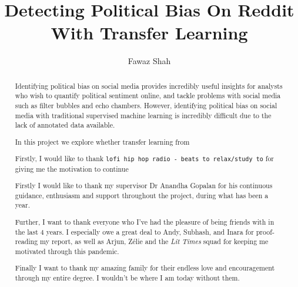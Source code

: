 \documentclass[a4paper, twoside]{report}
\title{Detecting Political Bias On Reddit With Transfer Learning}
\author{Fawaz Shah}
\begin{document}


\begin{abstract}

Identifying political bias on social media provides incredibly useful insights for analysts who wish to quantify political sentiment online, and tackle problems with social media such as filter bubbles and echo chambers. However, identifying political bias on social media with traditional supervised machine learning is incredibly difficult due to the lack of annotated data available.

In this project we explore whether transfer learning from 

\end{abstract}

\renewcommand{\abstractname}{Acknowledgements}
\begin{abstract}

Firstly, I would like to thank \texttt{lofi hip hop radio - beats to relax/study to} for giving me the motivation to continue

Firstly I would like to thank my supervisor Dr Anandha Gopalan for his continuous guidance, enthusiasm and support throughout the project, during what has been a  year.

Further, I want to thank everyone who I've had the pleasure of being friends with in the last 4 years. I especially owe a great deal to Andy, Subhash, and Inara for proof-reading my report, as well as Arjun, Zélie and the \textit{Lit Times} squad for keeping me motivated through this pandemic.

Finally I want to thank my amazing family for their endless love and encouragement through my entire degree. I wouldn't be where I am today without them.

\end{abstract}

\tableofcontents
\listoffigures
\listoftables









\end{document}
